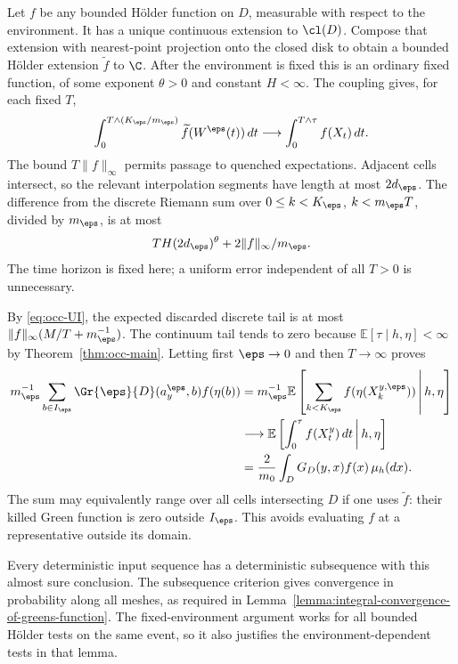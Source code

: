 Let $f$ be any bounded H\"older function on $D$, measurable with
respect to the environment. It has a unique continuous extension
to $\cl(D)$. Compose that extension with nearest-point projection
onto the closed disk to obtain a bounded H\"older extension
$\widetilde f$ to $\C$. After the environment is fixed this is
an ordinary fixed function, of some exponent $\theta>0$ and
constant $H<\infty$. The coupling gives, for each fixed $T$,
\[
 \int_0^{T\wedge(K_\eps/m_\eps)}
             \widetilde f(W^\eps(t))\,dt
       \longrightarrow \int_0^{T\wedge\tau}f(X_t)\,dt .
\]
The bound $T\|f\|_\infty$ permits passage to quenched expectations.
Adjacent cells intersect, so the relevant interpolation segments
have length at most $2d_\eps$. The difference from the discrete
Riemann sum over $0\leq k<K_\eps$, $k<m_\eps T$, divided by
$m_\eps$, is at most
\[
 T H(2d_\eps)^\theta+2\|f\|_\infty/m_\eps .
\]
The time horizon is fixed here; a uniform error independent of all
$T>0$ is unnecessary.

By \eqref{eq:occ-UI}, the expected discarded discrete tail is at most
$\|f\|_\infty(M/T+m_\eps^{-1})$. The continuum tail tends to zero
because $\mathbb{E}[\tau\mid h,\eta]<\infty$ by
Theorem~\ref{thm:occ-main}. Letting first $\eps\to0$ and then $T\to\infty$
proves
\begin{align*}
 m_\eps^{-1}\sum_{b\in I_\eps}
       \Gr{{\eps}}{D}(a_y^{{\eps}},b)f(\eta(b))
 &=m_\eps^{-1}\mathbb{E}\left[\sum_{k<K_\eps}
             f(\eta(X_k^{y,\eps}))\,\middle|\,h,\eta\right]\\
 &\longrightarrow
   \mathbb{E}\left[\int_0^\tau f(X_t^y)\,dt\,\middle|\,h,\eta\right]\\
 &=\frac2{m_0}\int_DG_D(y,x)f(x)\,\mu_h(dx).
\end{align*}
The sum may equivalently range over all cells intersecting $D$
if one uses $\widetilde f$: their killed Green function is zero
outside $I_\eps$. This avoids evaluating $f$ at a representative
outside its domain.

Every deterministic input sequence has a deterministic subsequence
with this almost sure conclusion. The subsequence criterion gives
convergence in probability along all meshes, as required in
Lemma~\ref{lemma:integral-convergence-of-greens-function}. The fixed-environment argument works for all bounded
H\"older tests on the same event, so it also justifies the
environment-dependent tests in that lemma.
